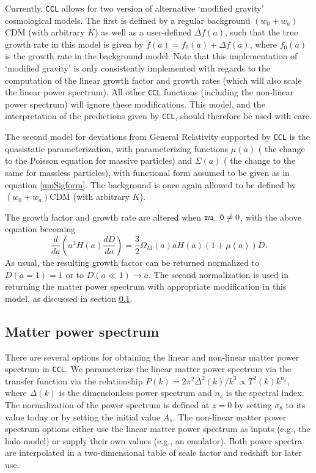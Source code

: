 \documentclass[\docopts]{\docclass}
\newcommand{\ccl}{{\tt CCL}\xspace}
\begin{document}
Currently, \ccl allows for two version of alternative `modified gravity'
cosmological models. The first is defined by a regular background
$(w_0+w_a)$CDM (with arbitrary $K$) as well as a user-defined $\Delta f(a)$,
such that the true growth rate in this model is given by $f(a)=f_0(a)+\Delta f(a)$,
where $f_0(a)$ is the growth rate in the background model. Note that this
implementation of `modified gravity' is only consistently implemented with
regards to the computation of the linear growth factor and growth rates
(which will also scale the linear power spectrum). All other \ccl functions
(including the non-linear power spectrum) will ignore these modifications.
This model, and the interpretation of the predictions given by \ccl,
should therefore be used with care.

The second model for deviations from General Relativity supported by \ccl is
the quasistatic parameterization, with parameterizing functions $\mu(a)$ (
the change to the Poisson equation for massive particles) and $\Sigma(a)$ (
the change to the same for massless particles), with functional form assumed to
be given as in equation \ref{muSigform}. The background is once again allowed
to be defined by $(w_0+w_a)$CDM (with arbitrary $K$).

The growth factor and growth rate are altered when ${\tt mu\_0} \ne 0$, with
the above equation becoming
\begin{equation}
  \frac{d}{da}\left(a^3H(a)\frac{dD}{da}\right)=\frac{3}{2}\Omega_M(a)aH(a)(1 + \mu(a))D.
\end{equation}
As usual, the resulting growth factor can be returned normalized to
$D(a=1)=1$ or to $D(a\ll1)\rightarrow a$. The second normalization is used in
returning the matter power spectrum with appropriate modification in this model,
as discussed in section \ref{sec:power}.

\subsection{Matter power spectrum}
\label{sec:power}

There are several options for obtaining the linear and non-linear matter power
spectrum in \ccl. We parameterize the linear matter power spectrum via the
transfer function via the relationship $P(k) = 2 \pi^2 \Delta^2(k) /k^3  \propto
T^2(k) k^{n_s}$, where $\Delta(k)$ is the dimensionless power spectrum and $n_s$
is the spectral index. The normalization of the power spectrum is defined at
$z=0$ by setting $\sigma_8$ to its value today or by setting the initial value
$A_s$. The non-linear matter power spectrum options either use the linear
matter power spectrum as inputs (e.g., the halo model) or supply their own
values (e.g., an emulator). Both power spectra are interpolated
in a two-dimensional table of scale factor and redshift for later use.
\end{document}
